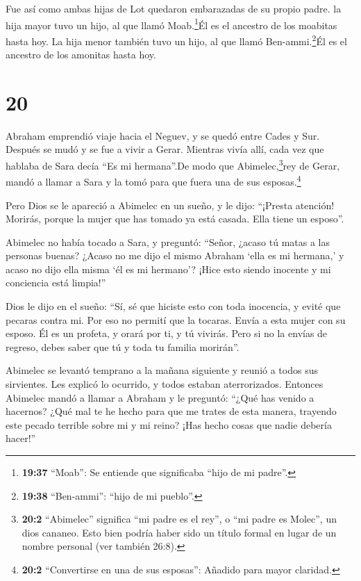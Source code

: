  Fue así como ambas hijas de Lot quedaron embarazadas de su
propio padre.  la hija mayor tuvo un hijo, al que llamó
Moab.\footnote{\textbf{19:37} ``Moab'': Se entiende que significaba
  ``hijo de mi padre''.}Él es el ancestro de los moabitas hasta hoy.
 La hija menor también tuvo un hijo, al que llamó
Ben-ammi.\footnote{\textbf{19:38} ``Ben-ammi'': ``hijo de mi pueblo''.}Él
es el ancestro de los amonitas hasta hoy.

\hypertarget{section-19}{%
\section{20}\label{section-19}}

 Abraham emprendió viaje hacia el Neguev, y se quedó entre
Cades y Sur. Después se mudó y se fue a vivir a Gerar. 
Mientras vivía allí, cada vez que hablaba de Sara decía ``Es mi
hermana''.De modo que Abimelec,\footnote{\textbf{20:2} ``Abimelec''
  significa ``mi padre es el rey'', o ``mi padre es Molec'', un dios
  cananeo. Esto bien podría haber sido un título formal en lugar de un
  nombre personal (ver también 26:8).}rey de Gerar, mandó a llamar a
Sara y la tomó para que fuera una de sus esposas.\footnote{\textbf{20:2}
  ``Convertirse en una de sus esposas'': Añadido para mayor claridad.}

 Pero Dios se le apareció a Abimelec en un sueño, y le dijo:
``¡Presta atención! Morirás, porque la mujer que has tomado ya está
casada. Ella tiene un esposo''.

 Abimelec no había tocado a Sara, y preguntó: ``Señor,
¿acaso tú matas a las personas buenas?  ¿Acaso no me dijo el
mismo Abraham `ella es mi hermana,' y acaso no dijo ella misma `él es mi
hermano'? ¡Hice esto siendo inocente y mi conciencia está limpia!''

 Dios le dijo en el sueño: ``Sí, sé que hiciste esto con
toda inocencia, y evité que pecaras contra mi. Por eso no permití que la
tocaras.  Envía a esta mujer con su esposo. Él es un
profeta, y orará por ti, y tú vivirás. Pero si no la envías de regreso,
debes saber que tú y toda tu familia morirán''.

 Abimelec se levantó temprano a la mañana siguiente y reunió
a todos sus sirvientes. Les explicó lo ocurrido, y todos estaban
aterrorizados.  Entonces Abimelec mandó a llamar a Abraham y
le preguntó: ``¿Qué has venido a hacernos? ¿Qué mal te he hecho para que
me trates de esta manera, trayendo este pecado terrible sobre mi y mi
reino? ¡Has hecho cosas que nadie debería hacer!''

